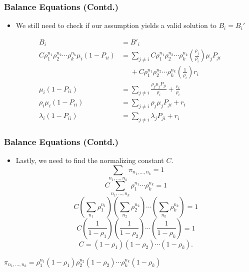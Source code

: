 \documentclass[10pt,notes]{beamer}
\begin{document}
\begin{frame}
    \frametitle{Balance Equations (Contd.)}
    \begin{itemize}
        \item We still need to check if our assumption yields a valid solution to $B_i = B_i'$
    \end{itemize}
    \begin{align*}
        B_i &= B'_i \\
        C \rho_1^{n_1} \rho_2^{n_2} \cdots \rho_k^{n_k} \mu_i (1 - P_{ii}) &= \sum_{j \neq i} C \rho_1^{n_1} \rho_2^{n_2} \cdots \rho_k^{n_k} \left( \frac{\rho_j}{\rho_i} \right) \mu_j P_{ji} \\
        &\phantom{=} + C \rho_1^{n_1} \rho_2^{n_2} \cdots \rho_k^{n_k} \left( \frac{1}{\rho_i} \right) r_i \\
        \mu_i (1 - P_{ii}) &= \sum_{j \neq i} \frac{\rho_j \mu_j P_{ji}}{\rho_i} + \frac{r_i}{\rho_i} \\
        \rho_i \mu_i (1 - P_{ii}) &= \sum_{j \neq i} \rho_j \mu_j P_{ji} + r_i \\
        \lambda_i (1 - P_{ii}) &= \sum_{j \neq i} \lambda_j P_{ji} + r_i
    \end{align*}

\end{frame}

\begin{frame}
    \frametitle{Balance Equations (Contd.)}
    \begin{itemize}
        \item Lastly, we need to find the normalizing constant $C$.
            $$\sum_{n_1,\ldots,n_k} \pi_{n_1,\ldots,n_k} = 1$$
            $$C \sum_{n_1,\ldots,n_k} \rho_1^{n_1} \cdots \rho_k^{n_k} = 1$$
            $$C \left( \sum_{n_1} \rho_1^{n_1} \right) \left( \sum_{n_2} \rho_2^{n_2} \right) \cdots \left( \sum_{n_k} \rho_k^{n_k} \right) = 1$$
            $$C \left( \frac{1}{1 - \rho_1} \right) \left( \frac{1}{1 - \rho_2} \right) \cdots \left( \frac{1}{1 - \rho_k} \right) = 1$$
            $$C = (1 - \rho_1) (1 - \rho_2) \cdots (1 - \rho_k).$$
    \end{itemize}
    \begin{tcolorbox}
        \centering $\pi_{n_1,\ldots,n_k} = \rho_1^{n_1} (1 - \rho_1) \rho_2^{n_2} (1 - \rho_2) \cdots \rho_k^{n_k} (1 - \rho_k)$
    \end{tcolorbox}
\end{frame}
\end{document}
